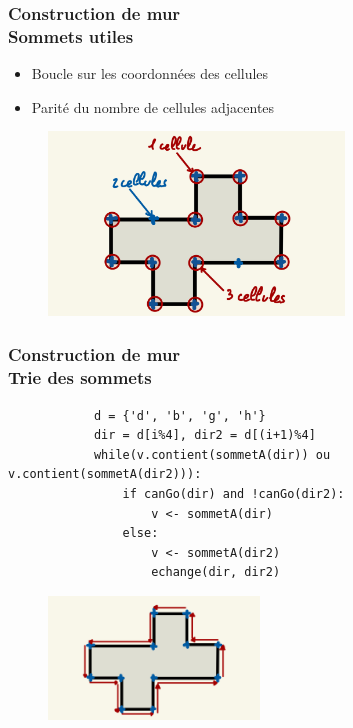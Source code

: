 \documentclass{beamer}
\begin{document}
\begin{frame}
    \frametitle{Construction de mur \\
                \small Sommets utiles}
    \begin{block}{}
        \begin{itemize}
            \item Boucle sur les coordonnées des cellules
            \item Parité du nombre de cellules adjacentes
        \end{itemize}
    \end{block}
    \begin{figure}
        \centering
        \includegraphics[width=0.7\textwidth]{images/sommets_utiles.jpg}
    \end{figure}
\end{frame}

\begin{frame}[fragile]
    \frametitle{Construction de mur \\
                \small Trie des sommets}
    \hspace*{-2.5cm}
    \begin{minipage}[t][3.5cm][t]{-1\textwidth} %
       
        \begin{verbatim}
            d = {'d', 'b', 'g', 'h'}
            dir = d[i%4], dir2 = d[(i+1)%4]
            while(v.contient(sommetA(dir)) ou v.contient(sommetA(dir2))):
                if canGo(dir) and !canGo(dir2):
                    v <- sommetA(dir)
                else:
                    v <- sommetA(dir2)
                    echange(dir, dir2)
        \end{verbatim}
    \end{minipage}
    \begin{figure}
        \centering
        \includegraphics[width=0.5\textwidth]{images/tri_sommet.jpg}
    \end{figure}
\end{frame}
\end{document}
